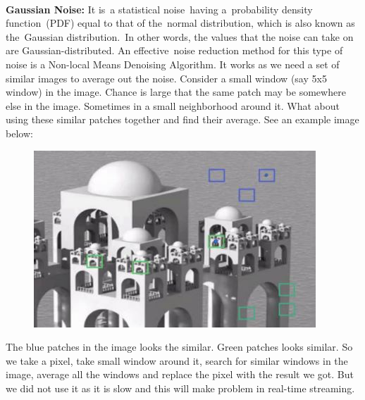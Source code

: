 \paragraph{}
\textbf{Gaussian Noise:}\newline
It is a statistical noise having a probability density function (PDF) equal to that of the normal distribution, which is also known as the Gaussian distribution. In other words, the values that the noise can take on are Gaussian-distributed.\newline
An effective noise reduction method for this type of noise is a Non-local Means Denoising Algorithm.\newline
It works as we need a set of similar images to average out the noise. Consider a small window (say 5x5 window) in the image. Chance is large that the same patch may be somewhere else in the image. Sometimes in a small neighborhood around it. What about using these similar patches together and find their average.\newline
See an example image below:\newline
\begin{figure}[H]
	\centering
	\includegraphics[width=\linewidth]{images/nlmd.jpg}
\end{figure}
The blue patches in the image looks the similar. Green patches looks similar. So we take a pixel, take small window around it, search for similar windows in the image, average all the windows and replace the pixel with the result we got.\newline
But we did not use it as it is slow and this will make problem in real-time streaming.

